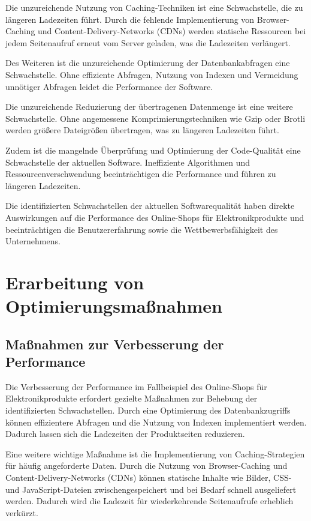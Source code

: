 Die unzureichende Nutzung von Caching-Techniken ist eine Schwachstelle, die zu längeren Ladezeiten führt. Durch die fehlende Implementierung von Browser-Caching und Content-Delivery-Networks (CDNs) werden statische Ressourcen bei jedem Seitenaufruf erneut vom Server geladen, was die Ladezeiten verlängert.

Des Weiteren ist die unzureichende Optimierung der Datenbankabfragen eine Schwachstelle. Ohne effiziente Abfragen, Nutzung von Indexen und Vermeidung unnötiger Abfragen leidet die Performance der Software.

Die unzureichende Reduzierung der übertragenen Datenmenge ist eine weitere Schwachstelle. Ohne angemessene Komprimierungstechniken wie Gzip oder Brotli werden größere Dateigrößen übertragen, was zu längeren Ladezeiten führt.

Zudem ist die mangelnde Überprüfung und Optimierung der Code-Qualität eine Schwachstelle der aktuellen Software. Ineffiziente Algorithmen und Ressourcenverschwendung beeinträchtigen die Performance und führen zu längeren Ladezeiten.

Die identifizierten Schwachstellen der aktuellen Softwarequalität haben direkte Auswirkungen auf die Performance des Online-Shops für Elektronikprodukte und beeinträchtigen die Benutzererfahrung sowie die Wettbewerbsfähigkeit des Unternehmens.

\section{Erarbeitung von Optimierungsmaßnahmen}
\subsection{Maßnahmen zur Verbesserung der Performance}
Die Verbesserung der Performance im Fallbeispiel des Online-Shops für Elektronikprodukte erfordert gezielte Maßnahmen zur Behebung der identifizierten Schwachstellen. Durch eine Optimierung des Datenbankzugriffs können effizientere Abfragen und die Nutzung von Indexen implementiert werden. Dadurch lassen sich die Ladezeiten der Produktseiten reduzieren.

Eine weitere wichtige Maßnahme ist die Implementierung von Caching-Strategien für häufig angeforderte Daten. Durch die Nutzung von Browser-Caching und Content-Delivery-Networks (CDNs) können statische Inhalte wie Bilder, CSS- und JavaScript-Dateien zwischengespeichert und bei Bedarf schnell ausgeliefert werden. Dadurch wird die Ladezeit für wiederkehrende Seitenaufrufe erheblich verkürzt.

